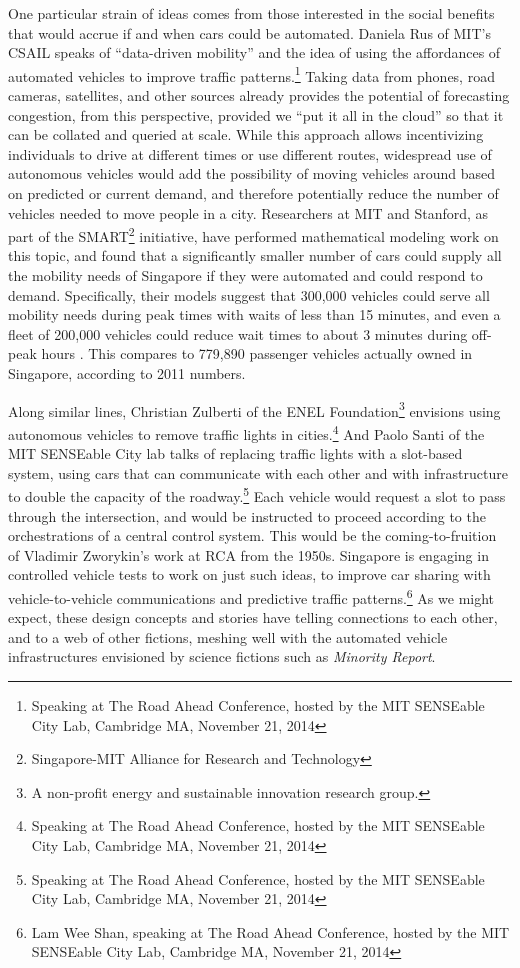 One particular strain of ideas comes from those interested in the
social benefits that would accrue if and when cars could be automated.
Daniela Rus of MIT's CSAIL speaks of ``data-driven mobility'' and the
idea of using the affordances of automated vehicles to improve traffic
patterns.\footnote{Speaking at The Road Ahead Conference, hosted by
  the MIT SENSEable City Lab, Cambridge MA, November 21, 2014} Taking
data from phones, road cameras, satellites, and other 
sources already provides the potential of forecasting congestion, from
this perspective,
provided we ``put it all in the cloud'' so that it can be collated and
queried at scale. While this approach allows incentivizing individuals to drive at
different times or use different routes, widespread use of autonomous vehicles would add
the possibility of moving vehicles around based on predicted or
current demand, and therefore potentially reduce the number of
vehicles needed to move people in a city. Researchers at MIT and Stanford, as part of the
SMART\footnote{Singapore-MIT Alliance for Research and Technology} initiative, have
performed mathematical modeling work on this topic, and found that a
significantly smaller number of cars could supply all the mobility
needs of Singapore if they were automated and could respond to demand.
Specifically, their models suggest that 300,000 vehicles could serve
all mobility needs during peak times with waits of less than 15
minutes, and even a fleet of 200,000 vehicles could reduce wait times
to about 3 minutes during off-peak hours \cite{frazzoliSingapore}. This
compares to 779,890 passenger vehicles actually owned in Singapore,
according to 2011 numbers.

Along similar
lines, Christian Zulberti of the ENEL Foundation\footnote{A non-profit
  energy and sustainable innovation research group.} envisions using
autonomous vehicles to remove traffic lights in
cities.\footnote{Speaking at The Road Ahead Conference, hosted by
  the MIT SENSEable City Lab, Cambridge MA, November 21, 2014} And Paolo
Santi of the MIT SENSEable City lab talks of replacing traffic lights
with a slot-based system, using cars that can communicate with each
other and with infrastructure to double the capacity of the
roadway.\footnote{Speaking at The Road Ahead Conference, hosted by
  the MIT SENSEable City Lab, Cambridge MA, November 21, 2014} Each vehicle would request a slot to pass through the
intersection, and would be instructed to proceed according to the
orchestrations of a central control system. This would be the coming-to-fruition of
Vladimir Zworykin's work at RCA from the 1950s. Singapore is engaging in
controlled vehicle tests to work on just such ideas, to improve car
sharing with vehicle-to-vehicle communications and predictive traffic
patterns.\footnote{Lam Wee Shan, speaking at The Road Ahead Conference, hosted by
  the MIT SENSEable City Lab, Cambridge MA, November 21, 2014} As we
might expect, these
design concepts and stories have telling connections to each other, and
to a web of other fictions, meshing well with the automated vehicle
infrastructures envisioned by science fictions such as \emph{Minority Report}.

